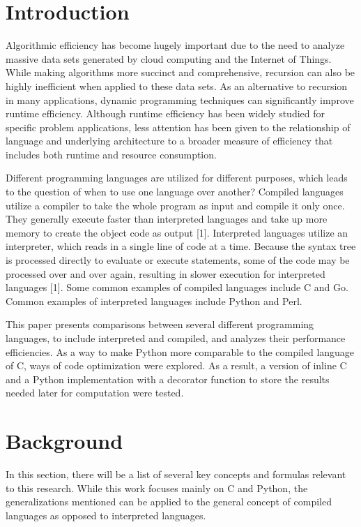 \documentclass{sig-alternate}
\begin{document}
\section{Introduction}
Algorithmic efficiency has become hugely important due to the need to analyze massive data sets generated by cloud computing and the Internet of Things. While making algorithms more succinct and comprehensive, recursion can also be highly inefficient when applied to these data sets. As an alternative to recursion in many applications, dynamic programming techniques can significantly improve runtime efficiency. Although runtime efficiency has been widely studied for specific problem applications, less attention has been given to the relationship of language and underlying architecture to a broader measure of efficiency that includes both runtime and resource consumption.

Different programming languages are utilized for different purposes, which leads to the question of when to use one language over another? Compiled languages utilize a compiler to take the whole program as input and compile it only once. They generally execute faster than interpreted languages and take up more memory to create the object code as output [1]. Interpreted languages utilize an interpreter, which reads in a single line of code at a time. Because the syntax tree is processed directly to evaluate or execute statements, some of the code may be processed over and over again, resulting in slower execution for interpreted languages [1]. Some common examples of compiled languages include C and Go. Common examples of interpreted languages include Python and Perl. 

This paper presents comparisons between several different programming languages, to include interpreted and compiled, and analyzes their performance efficiencies. As a way to make Python more comparable to the compiled language of C, ways of code optimization were explored. As a result, a version of inline C and a Python implementation with a decorator function to store the results needed later for computation were tested.

\section{Background}

In this section, there will be a list of several key concepts and formulas relevant to this research. While this work focuses mainly on C and Python, the generalizations mentioned can be applied to the general concept of compiled languages as opposed to interpreted languages. 
\end{document}
